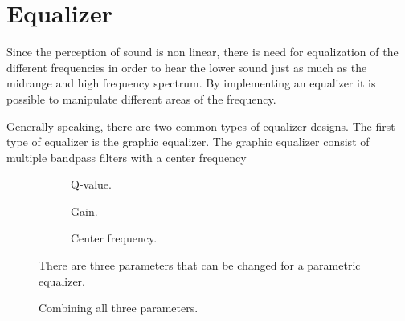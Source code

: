 \section{Equalizer}\label{sec:tech_equalizer}
Since the perception of sound is non linear, there is need for equalization of the different frequencies in order to hear the lower sound just as much as the midrange and high frequency spectrum. By implementing an equalizer it is possible to manipulate different areas of the frequency.

Generally speaking, there are two common types of equalizer designs. The first type of equalizer is the graphic equalizer. The graphic equalizer consist of multiple bandpass filters with a center frequency 

\begin{figure}[H]
\centering
\hspace*{-1cm}
\begin{subfigure}[t]{0.3\textwidth}
	
	\caption{Q-value.}
	\label{fig:parametric_q}
\end{subfigure}
\hspace{2mm} 
\begin{subfigure}[t]{0.3\textwidth}
	
	\caption{Gain.}
	\label{fig:parametric_db}
\end{subfigure}
\hspace{2mm}
\begin{subfigure}[t]{0.3\textwidth}
	
	\caption{Center frequency.}
	\label{fig:parametric_fc}
\end{subfigure}
\caption{There are three parameters that can be changed for a parametric equalizer.}
\label{fig:audioclipping}
\end{figure}


\begin{figure}[H]
\centering
{}

\caption{Combining all three parameters.}
\label{fig:parametric_eq_preanalysis_comb}
\end{figure}




